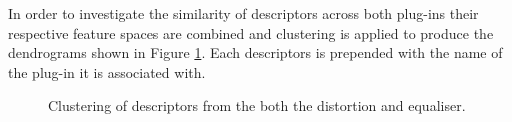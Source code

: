 		In order to investigate the similarity of descriptors across both plug-ins their respective feature spaces
		are combined and clustering is applied to produce the dendrograms shown in Figure
		\ref{fig:CombinedClusters}.  Each descriptors is prepended with the name of the plug-in it is associated
		with.

		\begin{figure}[h!]
			\centering
			\caption{Clustering of descriptors from the both the distortion and equaliser.}
			\label{fig:CombinedClusters}
		\end{figure}

